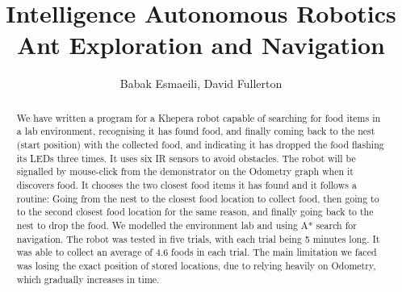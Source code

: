 \documentclass[]{article}
\begin{document}
\title{Intelligence Autonomous Robotics\\Ant Exploration and Navigation}
\author{Babak Esmaeili, David Fullerton}
\maketitle

\begin{abstract}
We have written a program for a Khepera robot capable of searching for food items in a lab environment, recognising it has found food, and finally coming back to the nest (start position) with the collected food, and indicating it has dropped the food flashing its LEDs three times. It uses six IR sensors to avoid obstacles. The robot will be signalled by mouse-click from the demonstrator on the Odometry graph when it discovers food. It chooses the two closest food items it has found and it follows a routine: Going from the nest to the closest food location to collect food, then going to to the second closest food location for the same reason, and finally going back to the nest to drop the food. We modelled the environment lab and using A* search for navigation. The robot was tested in five trials, with each trial being 5 minutes long. It was able to collect an average of 4.6 foods in each trial. The main limitation we faced was losing the exact position of stored locations, due to relying heavily on Odometry, which gradually increases in time.
\end{abstract}







\end{document}
